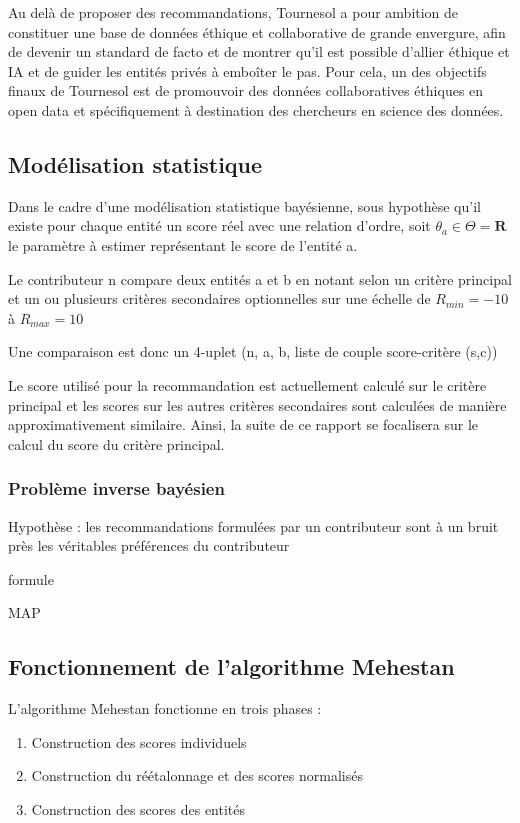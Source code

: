 Au delà de proposer des recommandations, Tournesol a pour ambition de constituer une base de données éthique et collaborative de grande envergure, afin de devenir un standard de facto et de montrer qu'il est possible d'allier éthique et IA et de guider les entités privés à emboîter le pas. Pour cela, un des objectifs finaux de Tournesol est de promouvoir des données collaboratives éthiques en open data et spécifiquement à destination des chercheurs en science des données.

\subsection{Modélisation statistique}

Dans le cadre d'une modélisation statistique bayésienne, sous hypothèse qu'il existe pour chaque entité un score réel avec une relation d'ordre, soit $\theta_{a}\in\Theta=\mathbf{R}$ le paramètre à estimer représentant le score de l'entité a.

Le contributeur n compare deux entités a et b en notant selon un critère principal et un ou plusieurs critères secondaires optionnelles sur une échelle de $R_{min}=-10$ à $R_{max}=10$

Une comparaison est donc un 4-uplet (n, a, b, liste de couple score-critère (s,c))

Le score utilisé pour la recommandation est actuellement calculé sur le critère principal et les scores sur les autres critères secondaires sont calculées de manière approximativement similaire. Ainsi, la suite de ce rapport se focalisera sur le calcul du score du critère principal.

\subsubsection{Problème inverse bayésien}
Hypothèse : les recommandations formulées par un contributeur sont à un bruit près les véritables préférences du contributeur


formule

MAP

\subsection{Fonctionnement de l'algorithme Mehestan}

L'algorithme Mehestan fonctionne en trois phases :

\begin{enumerate}
    \item Construction des scores individuels
    \item Construction du réétalonnage et des scores normalisés
    \item Construction des scores des entités
\end{enumerate}

